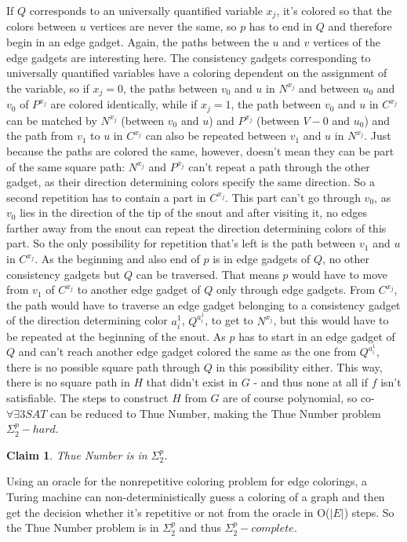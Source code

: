 \documentclass[12pt,a4paper]{article}
\newtheorem{claim}{Claim}
\begin{document}
\newline
If $Q$ corresponds to an universally quantified variable $x_j$, it's colored so that the colors between $u$ vertices are never the same, so $p$ has to end in $Q$ and therefore begin in an edge gadget. Again, the paths between the $u$ and $v$ vertices of the edge gadgets are interesting here. The consistency gadgets corresponding to universally quantified variables have a coloring dependent on the assignment of the variable, so if $x_j = 0$, the paths between $v_0$ and $u$ in $N^{x_j}$ and between $u_0$ and $v_0$ of $P^{x_j}$ are colored identically, while if $x_j = 1$, the path between $v_0$ and $u$ in $C^{x_j}$ can be matched by $N^{x_j}$ (between $v_0$ and $u$) and $P^{x_j}$ (between $V-0$ and $u_0$) and the path from $v_1$ to $u$ in $C^{x_j}$ can also be repeated between $v_1$ and $u$ in $N^{x_j}$. Just because the paths are colored the same, however, doesn't mean they can be part of the same square path:
\newline
$N^{x_j}$ and $P^{x_j}$ can't repeat a path through the other gadget, as their direction determining colors specify the same direction. So a second repetition has to contain a part in $C^{x_j}$. This part can't go through $v_0$, as $v_0$ lies in the direction of the tip of the snout and after visiting it, no edges farther away from the snout can repeat the direction determining colors of this part. So the only possibility for repetition that's left is the path between $v_1$ and $u$ in $C^{x_j}$. As the beginning and also end of $p$ is in edge gadgets of $Q$, no other consistency gadgets but $Q$ can be traversed. That means $p$ would have to move from $v_1$ of $C^{x_j}$ to another edge gadget of $Q$ only through edge gadgets. From $C^{x_j}$, the path would have to traverse an edge gadget belonging to a consistency gadget of the direction determining color $a_i^1$, $Q^{a_i^1}$, to get to $N^{x_j}$, but this would have to be repeated at the beginning of the snout. As $p$ has to start in an edge gadget of $Q$ and can't reach another edge gadget colored the same as the one from $Q^{a_i^1}$, there is no possible square path through $Q$ in this possibility either. 
\newline
This way, there is no square path in $H$ that didn't exist in $G$ - and thus none at all if $f$ isn't satisfiable. The steps to construct $H$ from $G$ are of course polynomial, so co-$\forall\exists3SAT$ can be reduced to Thue Number, making the Thue Number problem $\Sigma^p_2-hard$.
\newline
\begin{claim}
Thue Number is in $\Sigma^p_2$.
\end{claim}
Using an oracle for the nonrepetitive coloring problem for edge colorings, a Turing machine can non-deterministically guess a coloring of a graph and then get the decision whether it's repetitive or not from the oracle in O($|E|$) steps. So the Thue Number problem is in $\Sigma^p_2$ and thus $\Sigma^p_2-complete$.
\newpage	
\end{document}
